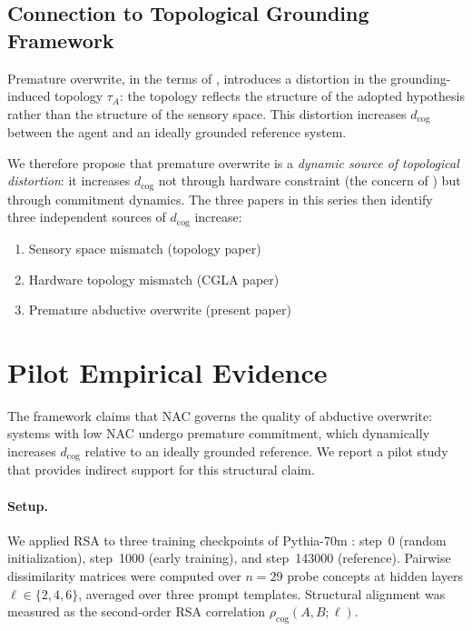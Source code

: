 \documentclass[12pt]{article}
\begin{document}
\subsection{Connection to Topological Grounding Framework}

Premature overwrite, in the terms of \cite{minamoto2026topology},
introduces a distortion in the grounding-induced topology $\tau_A$:
the topology reflects the structure of the adopted hypothesis rather
than the structure of the sensory space.
This distortion increases $d_\mathrm{cog}$ between the agent and
an ideally grounded reference system.

We therefore propose that premature overwrite is a \emph{dynamic
source of topological distortion}: it increases $d_\mathrm{cog}$
not through hardware constraint (the concern of \cite{minamoto2026cgla})
but through commitment dynamics.
The three papers in this series then identify three independent
sources of $d_\mathrm{cog}$ increase:
\begin{enumerate}
  \item Sensory space mismatch (topology paper)
  \item Hardware topology mismatch (CGLA paper)
  \item Premature abductive overwrite (present paper)
\end{enumerate}

\section{Pilot Empirical Evidence}
\label{sec:pilot}

The framework claims that NAC governs the quality of abductive
overwrite: systems with low NAC undergo premature commitment,
which dynamically increases $d_\mathrm{cog}$ relative to an
ideally grounded reference.
We report a pilot study that provides indirect support for
this structural claim.

\paragraph{Setup.}
We applied RSA to three training checkpoints of Pythia-70m
\cite{biderman2023}: step~0 (random initialization),
step~1000 (early training), and step~143000 (reference).
Pairwise dissimilarity matrices were computed over $n = 29$
probe concepts at hidden layers $\ell \in \{2, 4, 6\}$,
averaged over three prompt templates.
Structural alignment was measured as the second-order RSA
correlation $\rho_\mathrm{cog}(A, B; \ell)$.
\end{document}

